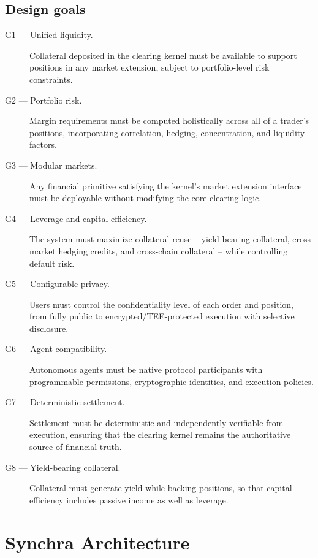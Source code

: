 \documentclass[11pt,a4paper]{article}
\begin{document}
\subsection{Design goals}

\begin{description}
  \item[G1 --- Unified liquidity.] Collateral deposited in the clearing kernel must be available to support positions in any market extension, subject to portfolio-level risk constraints.
  \item[G2 --- Portfolio risk.] Margin requirements must be computed holistically across all of a trader's positions, incorporating correlation, hedging, concentration, and liquidity factors.
  \item[G3 --- Modular markets.] Any financial primitive satisfying the kernel's market extension interface must be deployable without modifying the core clearing logic.
  \item[G4 --- Leverage and capital efficiency.] The system must maximize collateral reuse -- yield-bearing collateral, cross-market hedging credits, and cross-chain collateral -- while controlling default risk.
  \item[G5 --- Configurable privacy.] Users must control the confidentiality level of each order and position, from fully public to encrypted/TEE-protected execution with selective disclosure.
  \item[G6 --- Agent compatibility.] Autonomous agents must be native protocol participants with programmable permissions, cryptographic identities, and execution policies.
  \item[G7 --- Deterministic settlement.] Settlement must be deterministic and independently verifiable from execution, ensuring that the clearing kernel remains the authoritative source of financial truth.
  \item[G8 --- Yield-bearing collateral.] Collateral must generate yield while backing positions, so that capital efficiency includes passive income as well as leverage.
\end{description}

\section{Synchra Architecture}
\label{sec:architecture}
\end{document}

